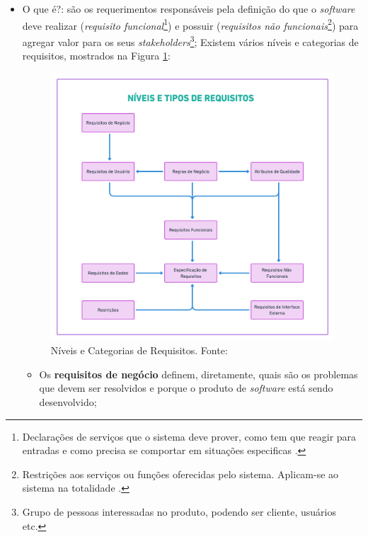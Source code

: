 \begin{itemize}
    \item O que é?: são os requerimentos responsáveis pela definição do que o \textit{software} deve realizar (\textit{requisito funcional}\footnote{Declarações de serviços que o sistema deve prover, como tem que reagir para entradas e como precisa se comportar em situações especificas \cite{Sommerville10}.}) e possuir (\textit{requisitos não funcionais}\footnote{Restrições aos serviços ou funções oferecidas pelo sistema. Aplicam-se ao sistema na totalidade \cite{Sommerville10}.}) para agregar valor para os seus \textit{stakeholders}\footnote{Grupo de pessoas interessadas no produto, podendo ser cliente, usuários etc.}; Existem vários níveis e categorias de requisitos, mostrados na Figura \ref{lev_tipo_req}:
    
    \begin{figure}[htb]
        \begin{center}
            \includegraphics[width=12cm, height=10cm, keepaspectratio]{figuras/Introducao/lev_tipo_req.png}
            \caption{{Níveis e Categorias de Requisitos. Fonte: \cite{westfall_5w2h}}}
            \label{lev_tipo_req}
        \end{center}
    \end{figure}
    
    \begin{itemize}
    
        \item Os \textbf{requisitos de negócio} definem, diretamente, quais são os problemas que devem ser resolvidos e porque o produto de \textit{software} está sendo desenvolvido;
        

\end{itemize}
\end{itemize}

